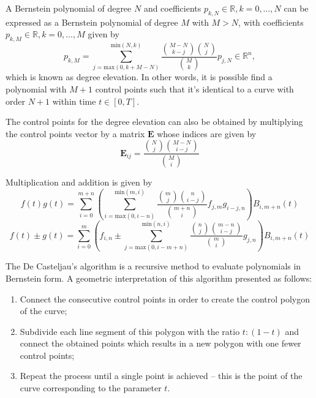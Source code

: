 \par A Bernstein polynomial of degree $N$ and coefficients $p_{k,N}\in \mathbb{R}, k = 0,\dots,N$ can be expressed as a Bernstein polynomial of degree $M$ with $M>N$, with coefficients $p_{k,M} \in \mathbb{R}, k = 0,\dots,M$ given by 
\begin{equation}
    p_{k,M} = \sum_{j=\text{max}(0,k+M-N)}^{\text{min}(N,k)} \frac{{M-N \choose k-j}{N\choose j}}{{M\choose k}} p_{j,N} \in \mathbb{R}^n,
\end{equation}
which is known as degree elevation. In other words, it is possible find a polynomial with $M+1$ control points such that it's identical to a curve with order $N+1$ within time $t\in[0,T]$.
\par The control points for the degree elevation can also be obtained by multiplying the control points vector by a matrix $\boldsymbol{E}$ whose indices are given by 
\begin{equation}
    \label{eq:bernsteinelevindices}
    \boldsymbol{E}_{ij} = \frac{{N\choose j}{M-N\choose i-j}}{{M\choose i}}
\end{equation}


\par Multiplication and addition is given by
\begin{equation}
    \label{eq:bern_mul}
    f(t)g(t) = \sum^{m+n}_{i=0}  \left(\sum_{i=\text{max}(0,i-n)}^{\text{min}(m,i)} \frac{\binom{m}{j}\binom{n}{i-j}}{\binom{m+n}{i}} f_{j,m}g_{i-j,n}\right) B_{i,m+n}(t)
\end{equation}
\begin{equation}
    \label{eq:bern_sum}
    f(t)\pm g(t) = 
    \sum^{m}_{i=0}  \left(f_{i,n} \pm \sum_{j=\text{max}(0,i-m+n)}^{\text{min}(n,i)} \frac{\binom{n}{j}\binom{m-n}{i-j}}{\binom{m}{i}} g_{j,n}\right) B_{i,m+n}(t)
\end{equation}

\par The De Casteljau's algorithm \cite{shene2012finding} is a recursive method to evaluate polynomials in Bernstein form. A geometric interpretation of this algorithm presented as follows:
\begin{enumerate}
    \item Connect the consecutive control points in order to create the control polygon of the curve;
	\item Subdivide each line segment of this polygon with the ratio $t:(1-t)$ and connect the obtained points which results in a new polygon with one fewer control points;
    \item Repeat the process until a single point is achieved – this is the point of the curve corresponding to the parameter $t$.
\end{enumerate}

